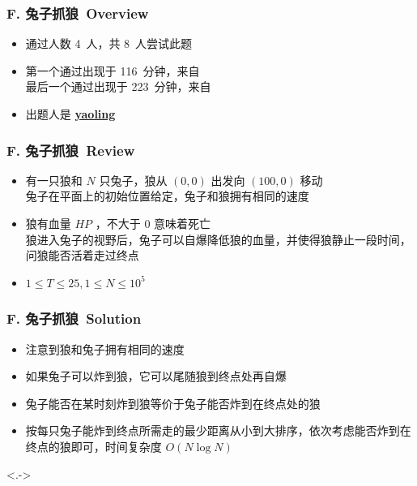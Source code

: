 \documentclass[notheorems]{beamer}
\newcommand{\zhProbF}{兔子抓狼}		\newcommand{\AuthProbF}{\textbf{\underline{\href{http://codeforces.com/profile/yaoling}{yaoling}}}}
\newcommand{\AccInProbF}{4}	\newcommand{\SubInProbF}{8}	\newcommand{\RatInProbF}{50.00\%}
\newcommand{\FirPenInProbF}{116}	\newcommand{\FirPerInProbF}{\NONE}
\newcommand{\LasPenInProbF}{223}	\newcommand{\LasPerInProbF}{\NONE}
\begin{document}
\begin{frame}[label = ProbF]
\frametitle{F. \zhProbF\ Overview}
\begin{spacing}{2.0} \large
\begin{itemize}[<+->]
\item 通过人数 \AccInProbF\ 人，共 \SubInProbF\ 人尝试此题
\item 第一个通过出现于 \FirPenInProbF\ 分钟，来自 \FirPerInProbF\ 
\\ 最后一个通过出现于 \LasPenInProbF\ 分钟，来自 \LasPerInProbF\ 
\item 出题人是 \AuthProbF\ 
\end{itemize}
\end{spacing}
\end{frame}
\begin{frame}
\frametitle{F. \zhProbF\ Review}
\begin{spacing}{2.0} \large
\begin{itemize}[<+->]
\item 有一只狼和 $N$ 只兔子，狼从 $(0, 0)$ 出发向 $(100, 0)$ 移动 \\ 兔子在平面上的初始位置给定，兔子和狼拥有\alert{相同的速度}
\item 狼有血量 $HP$ ，不大于 $0$ 意味着死亡 \\ 狼进入兔子的视野后，兔子可以自爆降低狼的血量，并使得狼静止一段时间，问狼能否活着\alert{走过}终点
\item $1 \leq T \leq 25, 1 \leq N \leq 10^5$
\end{itemize}
\end{spacing}
\end{frame}
\begin{frame}
\frametitle{F. \zhProbF\ Solution}
\begin{spacing}{2.0} \large
\begin{itemize}[<+->]
\item 注意到狼和兔子拥有\alert{相同的速度}
\item 如果兔子可以炸到狼，它可以尾随狼到终点处再自爆
\item 兔子能否在某时刻炸到狼等价于兔子能否炸到在终点处的狼
\item 按每只兔子能炸到终点所需走的最少距离从小到大排序，依次考虑能否炸到在终点的狼即可，时间复杂度 $O(N \log N)$
\end{itemize}
\end{spacing}
\visible<.->{\hyperlink{Overview}{\beamerreturnbutton{Go Back}}}
\end{frame}
\end{document}
